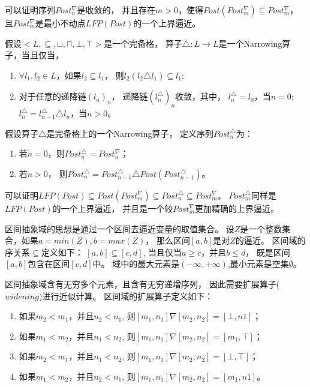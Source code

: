 可以证明序列$Post_{n}^{\nabla}$是收敛的，
并且存在$m > 0$，使得$Post(Post_{m}^{\nabla}) \subseteq Post_{m}^{\nabla}$，
且$Post_{m}^{\nabla}$是最小不动点$LFP(Post)$的一个上界逼近。

\begin{definition}[Narrowing算子]
假设$<L,\subseteq, \sqcup, \sqcap, \bot,\top>$是一个完备格，
算子$\triangle: L \rightarrow L$是一个Narrowing算子，当且仅当，
\begin{enumerate}
\item $\forall l_1,l_2 \in L$，如果$l_2 \subseteq l_1$，
	则$l_2 (l_2\triangle l_1) \subseteq l_1$;
\item 对于任意的递降链$(l_n)_n$，
	递降链$(l_{n}^{\triangle})_n$收敛，其中，
	$l_{n}^{\triangle} = l_0$，当$n=0$;
	$l_{n}^{\triangle} = l_{n-1}^{\triangle} \triangle l_n$，当$n>0$。
\end{enumerate}
\end{definition}

假设算子$\triangle$是完备格上的一个Narrowing算子，
定义序列$Post_{n}^{\triangle}$为：

\begin{enumerate}
	\item 若$n=0$，则$Post_{n}^{\triangle} = Post_{n}^{\nabla}$；
	\item 若$n > 0$，
	则$Post_{n}^{\triangle} = Post_{n-1}^{\triangle} \triangle Post(Post_{n-1}^{\triangle})$。
\end{enumerate}

可以证明$LFP(Post) \subseteq Post(Post_{m}^{\nabla}) 
\subseteq  Post_{n}^{\triangle} \subseteq Post_{m}^{\nabla}$。
$Post_{m}^{\triangle}$同样是$LFP(Post)$的一个上界逼近，
并且是一个较$Post_{m}^{\nabla}$更加精确的上界逼近。


\begin{example}
	区间抽象域的思想是通过一个区间去逼近变量的取值集合。
	设$Z$是一个整数集合，如果$a=min(Z), b=max(Z)$，
	那么区间$[a,b]$是对$Z$的逼近。
	区间域的序关系$\subseteq$定义如下： $[a,b] \subseteq [c,d]$,
	当且仅当$a \geq c$，并且$b \leq d$，
	既是区间$[a,b]$包含在区间$[c,d]$中。
	域中的最大元素是$(-\infty, +\infty)$,最小元素是空集$\emptyset$。
	
	区间抽象域含有无穷多个元素，且含有无穷递增序列，
	因此需要扩展算子($widening$)进行近似计算。
	区间域的扩展算子定义如下：
	
	\begin{enumerate}
	\item 如果$m_2 < m_1$，并且$n_2 < n_1$,		
	则$[m_1, n_1] \nabla [m_2, n_2] = [\bot, n1]$；
	\item 如果$m_1 < m_2$，并且$n_1 < n_2$,
	则$[m_1, n_1] \nabla [m_2, n_2] = [m_1, \top]$；
	\item 如果$m_2 < m_1$，并且$n_1 < n_2$,
	则$[m_1, n_1] \nabla [m_2, n_2] = [\bot, \top]$；
	\item  如果$m_1 < m_2$，并且$n_2 < n_1$,
	则$[m_1, n_1] \nabla [m_2, n_2] = [m_1, n1]$。
	\end{enumerate}
\end{example}

